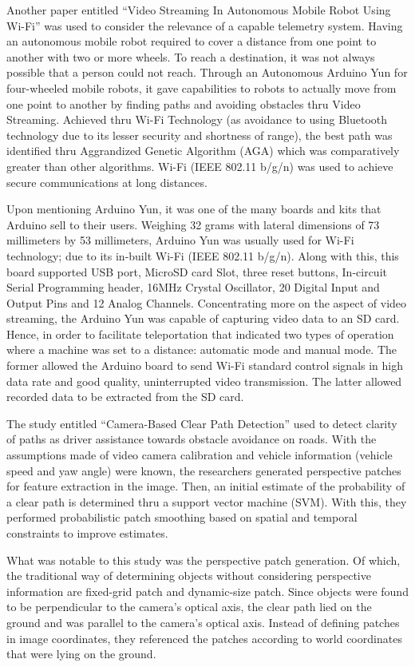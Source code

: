 Another paper entitled “Video Streaming In Autonomous Mobile Robot Using Wi-Fi” was used to consider the relevance of a capable telemetry system. Having an autonomous mobile robot required to cover a distance from one point to another with two or more wheels. To reach a destination, it was not always possible that a person could not reach. Through an Autonomous Arduino Yun for four-wheeled mobile robots, it gave capabilities to robots to actually move from one point to another by finding paths and avoiding obstacles thru Video Streaming. Achieved thru Wi-Fi Technology (as avoidance to using Bluetooth technology due to its lesser security and shortness of range), the best path was identified thru Aggrandized Genetic Algorithm (AGA) which was comparatively greater than other algorithms. Wi-Fi (IEEE 802.11 b/g/n) was used to achieve secure communications at long distances.
 
Upon mentioning Arduino Yun, it was one of the many boards and kits that Arduino sell to their users. Weighing 32 grams with lateral dimensions of 73 millimeters by 53 millimeters, Arduino Yun was usually used for Wi-Fi technology; due to its in-built Wi-Fi (IEEE 802.11 b/g/n). Along with this, this board supported USB port, MicroSD card Slot, three reset buttons, In-circuit Serial Programming header, 16MHz Crystal Oscillator, 20 Digital Input and Output Pins and 12 Analog Channels. Concentrating more on the aspect of video streaming, the Arduino Yun was capable of capturing video data to an SD card. Hence, in order to facilitate teleportation that indicated two types of operation where a machine was set to a distance: automatic mode and manual mode. The former allowed the Arduino board to send Wi-Fi standard control signals in high data rate and good quality, uninterrupted video transmission. The latter allowed recorded data to be extracted from the SD card.
 
The study entitled “Camera-Based Clear Path Detection” used to detect clarity of paths as driver assistance towards obstacle avoidance on roads. With the assumptions made of video camera calibration and vehicle information (vehicle speed and yaw angle) were known, the researchers generated perspective patches for feature extraction in the image. Then, an initial estimate of the probability of a clear path is determined thru a support vector machine (SVM). With this, they performed probabilistic patch smoothing based on spatial and temporal constraints to improve estimates.
 
    What was notable to this study was the perspective patch generation. Of which, the traditional way of determining objects without considering perspective information are fixed-grid patch and dynamic-size patch. Since objects were found to be perpendicular to the camera’s optical axis, the clear path lied on the ground and was parallel to the camera’s optical axis. Instead of defining patches in image coordinates, they referenced the patches according to world coordinates that were lying on the ground.
   
